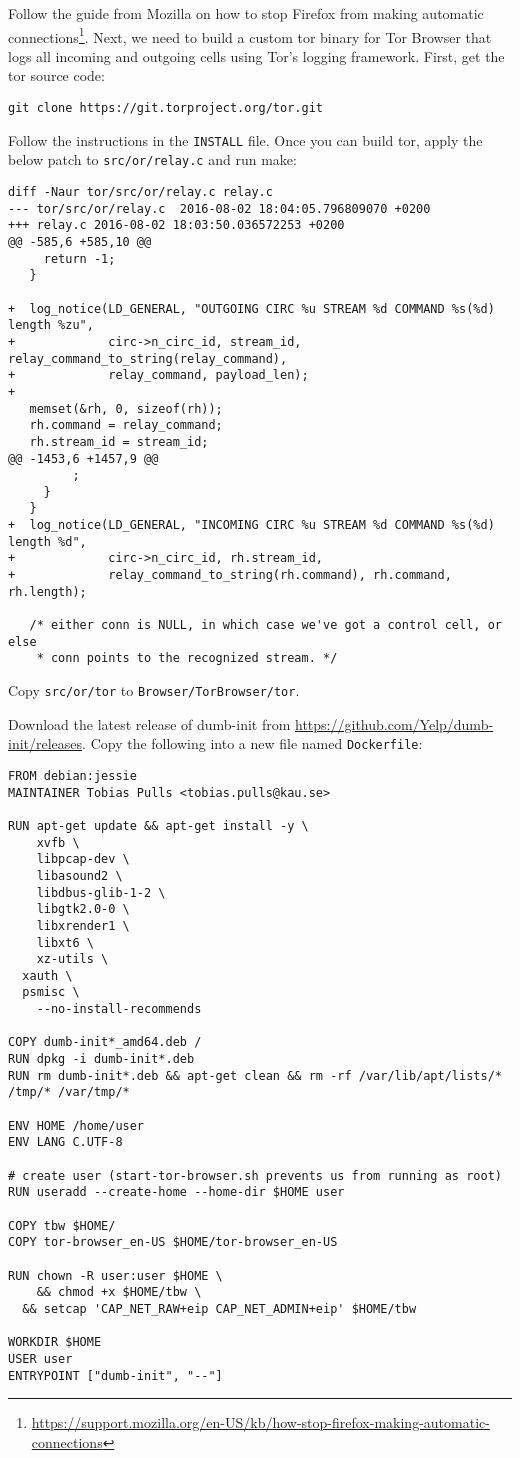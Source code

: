 \documentclass{article}
\begin{document}
Follow the guide from Mozilla on how to stop Firefox from making automatic
connections\footnote{\url{https://support.mozilla.org/en-US/kb/how-stop-firefox-making-automatic-connections}}.
Next, we need to build a custom tor binary for Tor Browser that logs all
incoming and outgoing cells using Tor's logging framework. First, get the tor
source code:

\begin{lstlisting}
git clone https://git.torproject.org/tor.git
\end{lstlisting}
Follow the instructions in the {\tt INSTALL} file. Once you can build tor,
apply the below patch to {\tt src/or/relay.c} and run make:
\begin{lstlisting}
diff -Naur tor/src/or/relay.c relay.c
--- tor/src/or/relay.c	2016-08-02 18:04:05.796809070 +0200
+++ relay.c	2016-08-02 18:03:50.036572253 +0200
@@ -585,6 +585,10 @@
     return -1;
   }

+  log_notice(LD_GENERAL, "OUTGOING CIRC %u STREAM %d COMMAND %s(%d) length %zu",
+             circ->n_circ_id, stream_id, relay_command_to_string(relay_command),
+             relay_command, payload_len);
+
   memset(&rh, 0, sizeof(rh));
   rh.command = relay_command;
   rh.stream_id = stream_id;
@@ -1453,6 +1457,9 @@
         ;
     }
   }
+  log_notice(LD_GENERAL, "INCOMING CIRC %u STREAM %d COMMAND %s(%d) length %d",
+             circ->n_circ_id, rh.stream_id,
+             relay_command_to_string(rh.command), rh.command, rh.length);

   /* either conn is NULL, in which case we've got a control cell, or else
    * conn points to the recognized stream. */
\end{lstlisting}
Copy {\tt src/or/tor} to {\tt Browser/TorBrowser/tor}.

Download the latest release of dumb-init from
\url{https://github.com/Yelp/dumb-init/releases}.
Copy the following into a
new file named \texttt{Dockerfile}:

\begin{lstlisting}
FROM debian:jessie
MAINTAINER Tobias Pulls <tobias.pulls@kau.se>

RUN apt-get update && apt-get install -y \
	xvfb \
	libpcap-dev \
	libasound2 \
	libdbus-glib-1-2 \
	libgtk2.0-0 \
	libxrender1 \
	libxt6 \
	xz-utils \
  xauth \
  psmisc \
	--no-install-recommends

COPY dumb-init*_amd64.deb /
RUN dpkg -i dumb-init*.deb
RUN rm dumb-init*.deb && apt-get clean && rm -rf /var/lib/apt/lists/* /tmp/* /var/tmp/*

ENV HOME /home/user
ENV LANG C.UTF-8

# create user (start-tor-browser.sh prevents us from running as root)
RUN useradd --create-home --home-dir $HOME user

COPY tbw $HOME/
COPY tor-browser_en-US $HOME/tor-browser_en-US

RUN chown -R user:user $HOME \
	&& chmod +x $HOME/tbw \
  && setcap 'CAP_NET_RAW+eip CAP_NET_ADMIN+eip' $HOME/tbw

WORKDIR $HOME
USER user
ENTRYPOINT ["dumb-init", "--"]
\end{lstlisting}
\end{document}
